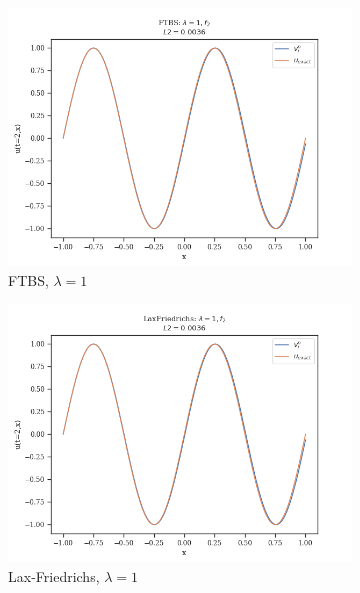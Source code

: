 \begin{figure}
\begin{subfigure}{0.3\linewidth}
        \includegraphics[width=\linewidth]{figures/FTBS/FTBS_lambda=1,f2}
        \caption{FTBS, $\lambda = 1$}
    \end{subfigure}
    \hfill
    \begin{subfigure}{0.3\linewidth}
        \centering
        \includegraphics[width=\linewidth]{figures/LaxFriedrichs/LaxFriedrichs_lambda=1,f2}
        \caption{Lax-Friedrichs, $\lambda =1$}
    \end{subfigure}
    \hfill
    \begin{subfigure}{0.3\linewidth}
        \centering

\end{subfigure}
\end{figure}
